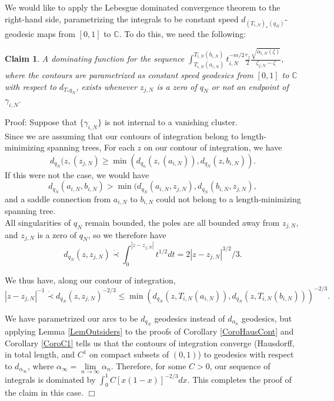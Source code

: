 \documentclass[12pt]{article}
\newtheorem{claim}[theorem]{Claim}
\newcommand{\cc}{\mathbb{C}}
\begin{document}
\noindent We would like to apply the Lebesgue dominated convergence theorem to the right-hand side, parametrizing the integrals to be constant speed $d_{(T_{i,N})_*(q_N)}$-geodesic maps from $[0,1]$ to $\cc$. To do this, we need the following:

\begin{claim}A dominating function for the sequence $\int_{T_{i,N}(a_{i,N})}^{T_{i,N}(b_{i,N})} t_{i,N}^{-m/2}\frac{e_j}{2}\frac{\sqrt{\alpha_{i,N}(\zeta)}}{\zeta_{j,N} - \zeta}$, where the contours are parametrized as constant speed geodesics from $[0,1]$ to $\cc$ with respect to $d_{T_*{q_N}}$, exists whenever $z_{j,N}$ is a zero of $q_N$ or not an endpoint of $\gamma_{i,N}$.\end{claim}

\noindent Proof: Suppose that $\{\gamma_{i,N}\}$ is not internal to a vanishing cluster.\\

\noindent Since we are assuming that our contours of integration belong to length-minimizing spanning trees, For each $z$ on our contour of integration, we have $$d_{q_N}(z,(z_{j,N}) \geq  \min(d_{q_n}(z,(a_{i,N})),d_{q_N}(z,b_{i,N})).$$ If this were not the case, we would have $$d_{q_N}(a_{i,N},b_{i,N}) > \min(d_{q_N}(a_{i,N},z_{j,N}),d_{q_N}(b_{i,N},z_{j,N}),$$ and a saddle connection from $a_{i,N}$ to $b_{i,N}$ could not belong to a length-minimizing spanning tree.\\

\noindent All singularities of $q_N$ remain bounded, the poles are all bounded away from $z_{j,N}$, and $z_{j,N}$ is a zero of $q_N$, so we therefore have $$d_{q_N}(z, z_{j,N}) \dot{\prec} \int_0^{|z - z_{j,N}|} t^{1/2} dt = 2|z - z_{j,N}|^{3/2}/3.$$

\noindent We thus have, along our contour of integration, $$|z - z_{j,N}|^{-1} \dot{\prec} d_{q_N}(z,z_{j,N})^{-2/3} \leq \min (d_{q_N}(z, T_{i,N}(a_{i,N})),d_{q_N}(z, T_{i,N}(b_{i,N})))^{-2/3}.$$

\noindent We have parametrized our arcs to be $d_{q_N}$ geodesics instead of $d_{\alpha_n}$ geodesics, but applying Lemma \ref{LemOutsiders} to the proofs of Corollary \ref{CoroHausCont} and Corollary \ref{CoroC1} tells us that the contours of integration converge (Hausdorff, in total length, and $C^1$ on compact subsets of $(0,1)$) to geodesics with respect to $d_{\alpha_\infty}$, where $\alpha_\infty = \lim\limits_{n \to \infty} \alpha_n$. Therefore, for some $C > 0$, our sequence of integrals is dominated by $\int_0^1 C[x(1-x)]^{-2/3}dx.$ This completes the proof of the claim in this case. $\Box$
\end{document}
